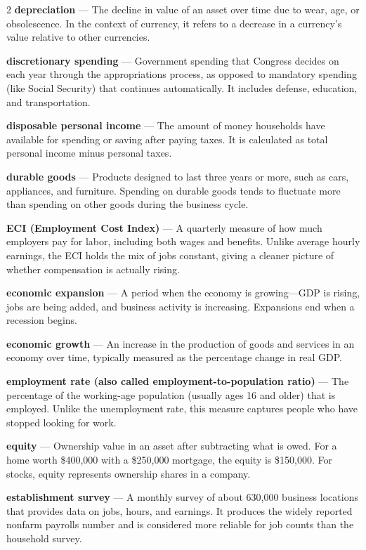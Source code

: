 \begin{multicols}{2}
\textbf{depreciation} --- The decline in value of an asset over time due to wear, age, or obsolescence. In the context of currency, it refers to a decrease in a currency's value relative to other currencies.

\textbf{discretionary spending} --- Government spending that Congress decides on each year through the appropriations process, as opposed to mandatory spending (like Social Security) that continues automatically. It includes defense, education, and transportation.

\textbf{disposable personal income} --- The amount of money households have available for spending or saving after paying taxes. It is calculated as total personal income minus personal taxes.

\textbf{durable goods} --- Products designed to last three years or more, such as cars, appliances, and furniture. Spending on durable goods tends to fluctuate more than spending on other goods during the business cycle.

\textbf{ECI (Employment Cost Index)} --- A quarterly measure of how much employers pay for labor, including both wages and benefits. Unlike average hourly earnings, the ECI holds the mix of jobs constant, giving a cleaner picture of whether compensation is actually rising.

\textbf{economic expansion} --- A period when the economy is growing---GDP is rising, jobs are being added, and business activity is increasing. Expansions end when a recession begins.

\textbf{economic growth} --- An increase in the production of goods and services in an economy over time, typically measured as the percentage change in real GDP.

\textbf{employment rate (also called employment-to-population ratio)} --- The percentage of the working-age population (usually ages 16 and older) that is employed. Unlike the unemployment rate, this measure captures people who have stopped looking for work.

\textbf{equity} --- Ownership value in an asset after subtracting what is owed. For a home worth \$400,000 with a \$250,000 mortgage, the equity is \$150,000. For stocks, equity represents ownership shares in a company.

\textbf{establishment survey} --- A monthly survey of about 630,000 business locations that provides data on jobs, hours, and earnings. It produces the widely reported nonfarm payrolls number and is considered more reliable for job counts than the household survey.


\end{multicols}
